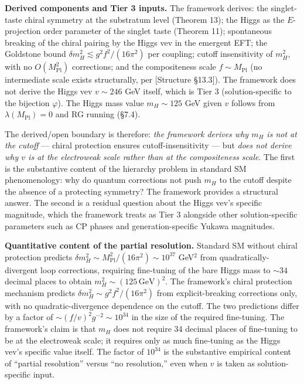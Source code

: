 \documentclass[
]{article}
\begin{document}
\textbf{Derived components and Tier 3 inputs.} The framework derives:
the singlet-taste chiral symmetry at the substratum level (Theorem 13);
the Higgs as the \(E\)-projection order parameter of the singlet taste
(Theorem 11); spontaneous breaking of the chiral pairing by the Higgs
vev in the emergent EFT; the Goldstone bound
\(\delta m_H^2 \lesssim g^2 f^2/(16\pi^2)\) per coupling; cutoff
insensitivity of \(m_H^2\), with no \(O(M_{\mathrm{Pl}}^2)\)
corrections; and the compositeness scale \(f \sim M_{\mathrm{Pl}}\) (no
intermediate scale exists structurally, per {[}Structure §13.3{]}). The
framework does not derive the Higgs vev \(v \sim 246\) GeV itself, which
is Tier 3 (solution-specific to the bijection \(\varphi\)). The Higgs
mass value \(m_H \sim 125\) GeV given \(v\) follows from
\(\lambda(M_{\mathrm{Pl}}) = 0\) and RG running (§7.4).

The derived/open boundary is therefore: \emph{the framework derives why
\(m_H\) is not at the cutoff} --- chiral protection ensures
cutoff-insensitivity --- but \emph{does not derive why \(v\) is at the
electroweak scale rather than at the compositeness scale}. The first is
the substantive content of the hierarchy problem in standard SM
phenomenology: why do quantum corrections not push \(m_H\) to the cutoff
despite the absence of a protecting symmetry? The framework provides a
structural answer. The second is a residual question about the Higgs
vev's specific magnitude, which the framework treats as Tier 3 alongside
other solution-specific parameters such as CP phases and
generation-specific Yukawa magnitudes.

\textbf{Quantitative content of the partial resolution.} Standard SM
without chiral protection predicts
\(\delta m_H^2 \sim M_{\mathrm{Pl}}^2 / (16\pi^2) \sim 10^{37}\)
GeV\(^2\) from quadratically-divergent loop corrections, requiring
fine-tuning of the bare Higgs mass to \(\sim 34\) decimal places to
obtain \(m_H^2 \sim (125\,\text{GeV})^2\). The framework's chiral
protection mechanism predicts \(\delta m_H^2 \sim g^2 f^2 / (16\pi^2)\)
from explicit-breaking corrections only, with no quadratic-divergence
dependence on the cutoff. The two predictions differ by a factor of
\(\sim (f/v)^2 g^{-2} \sim 10^{34}\) in the size of the required
fine-tuning. The framework's claim is that \(m_H\) does not require 34
decimal places of fine-tuning to be at the electroweak scale; it
requires only as much fine-tuning as the Higgs vev's specific value
itself. The factor of \(10^{34}\) is the substantive empirical content
of ``partial resolution'' versus ``no resolution,'' even when \(v\) is
taken as solution-specific input.
\end{document}
